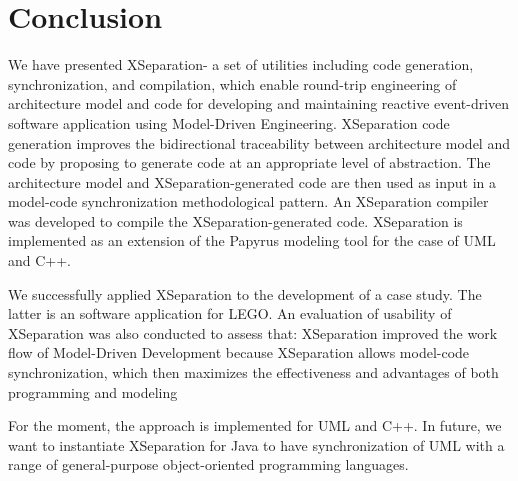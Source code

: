 \section{Conclusion}
\label{sec:conclusion}
We have presented XSeparation- a set of utilities including code generation, synchronization, and compilation, which enable round-trip engineering of architecture model and code for developing and maintaining reactive event-driven software application using Model-Driven Engineering.
XSeparation code generation improves the bidirectional traceability between architecture model and code by proposing to generate code at an appropriate level of abstraction. 
The architecture model and XSeparation-generated code are then used as input in a model-code synchronization methodological pattern.
An XSeparation compiler was developed to compile the XSeparation-generated code.
XSeparation is implemented as an extension of the Papyrus modeling tool for the case of UML and C++. 

We successfully applied XSeparation to the development of a case study.
The latter is an software application for LEGO.
An evaluation of usability of XSeparation was also conducted to assess that: XSeparation improved the work flow of Model-Driven Development because XSeparation allows model-code synchronization, which then maximizes the effectiveness and advantages of both programming and modeling  

For the moment, the approach is implemented for UML and C++.
In future, we want to instantiate XSeparation for Java to have synchronization of UML with a range of general-purpose object-oriented programming languages. 
 


